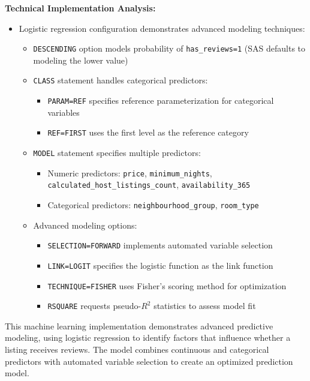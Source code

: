 \documentclass{article}
\begin{document}
\noindent
\textbf{Technical Implementation Analysis:}
\begin{itemize}[leftmargin=*]
    \item Logistic regression configuration demonstrates advanced modeling techniques:
    \begin{itemize}
        \item \texttt{DESCENDING} option models probability of \texttt{has\_reviews=1} (SAS defaults to modeling the lower value)
        \item \texttt{CLASS} statement handles categorical predictors:
        \begin{itemize}
            \item \texttt{PARAM=REF} specifies reference parameterization for categorical variables
            \item \texttt{REF=FIRST} uses the first level as the reference category
        \end{itemize}
        \item \texttt{MODEL} statement specifies multiple predictors:
        \begin{itemize}
            \item Numeric predictors: \texttt{price}, \texttt{minimum\_nights}, \texttt{calculated\_host\_listings\_count}, \texttt{availability\_365}
            \item Categorical predictors: \texttt{neighbourhood\_group}, \texttt{room\_type}
        \end{itemize}
        \item Advanced modeling options:
        \begin{itemize}
            \item \texttt{SELECTION=FORWARD} implements automated variable selection
            \item \texttt{LINK=LOGIT} specifies the logistic function as the link function
            \item \texttt{TECHNIQUE=FISHER} uses Fisher's scoring method for optimization
            \item \texttt{RSQUARE} requests pseudo-$R^2$ statistics to assess model fit
        \end{itemize}
    \end{itemize}
\end{itemize}

This machine learning implementation demonstrates advanced predictive modeling, using logistic regression to identify factors that influence whether a listing receives reviews. The model combines continuous and categorical predictors with automated variable selection to create an optimized prediction model.
\end{document}
